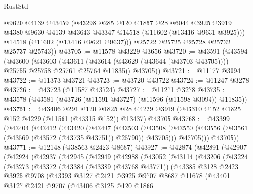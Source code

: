 \begin{lexlean}{RustStd}
\begin{coremodule}
          @9620
          @4139
          @43459
          (@43298
            @285
            @120
            @1857
            @28
            @6044
            @3925
            @3919
            @4380
            @9630
            @4139
            @43643
            @43347
            @14518
            (@11602 (@13416 @9631 @3925)))
          @14518
          (@11602 (@13416 @9621 @9637)))
        @25722
        @25725
        @25728
        @25732
        @25737
        @25743))
@43705 := @11578 @43229 @3656
@43720 := @43591
    (@43594
      (@43600
        (@43603
          (@43611 (@43614 (@43629 (@43644 (@43703 @43705)))) @25755 @25758 @25761 @25764 @11835))
        @43705))
@43721 := @11177 @3094
@43722 := @11373 @43721
@43723 := @43720 @43722
@43724 := @11247 @3278
@43726 := @43723 (@11587 @43724)
@43727 := @11271 @3278
@43735 := @43578 (@43581 (@43726 (@11591 @43727) (@11596 (@11598 @3094)) @11835))
@43751 := @43406
    @291
    @120
    @1825
    @28
    @4229
    @3919
    (@43310 @152 @1825 @152 @4229 (@11561 (@43315 @152)) @13437)
    @43705
@43768 := @43399
    (@43404
      (@43412
        (@43420
          (@43497
            (@43503
              (@43508 (@43550 (@43556 (@43561 (@43569 (@43572 (@43735 @43751)) @25790)) @43705)))
              @43705)))
        @43705))
@43771 := @12148 (@38563 @2423 @8687)
@43927 := @42874
    (@42891
      (@42907
        (@42924
          (@42937
            (@42945
              (@42949
                (@42988
                  (@43052
                    (@43114
                      (@43206
                        (@43224
                          (@43273
                            (@43372
                              (@43384
                                (@43389 (@43768 @43771))
                                (@43385
                                  @3128
                                  @2423
                                  @3925
                                  @9708
                                  (@43393
                                    @3127
                                    @2421
                                    @3925
                                    @9707
                                    @8687
                                    @11678
                                    (@43401
                                      @3127
                                      @2421
                                      @9707
                                      (@43406
                                        @3125
                                        @120
                                        @1866

\end{coremodule}
\end{lexlean}
